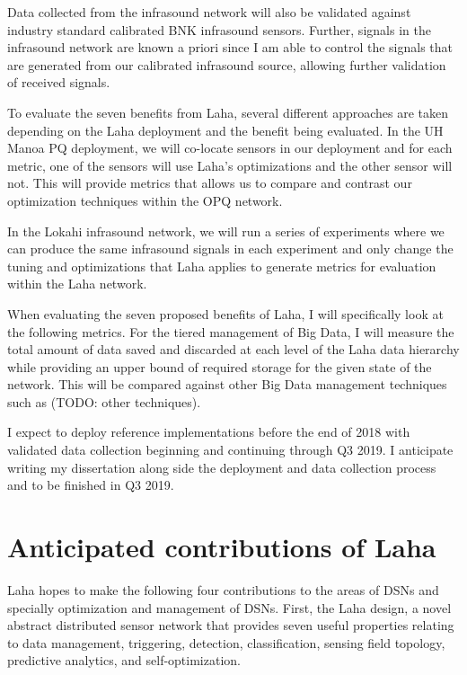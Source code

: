 Data collected from the infrasound network will also be validated against industry standard calibrated BNK infrasound sensors. Further, signals in the infrasound network are known a priori since I am able to control the signals that are generated from our calibrated infrasound source, allowing further validation of received signals.

To evaluate the seven benefits from Laha, several different approaches are taken depending on the Laha deployment and the benefit being evaluated. In the UH Manoa PQ deployment, we will co-locate sensors in our deployment and for each metric, one of the sensors will use Laha's optimizations and the other sensor will not. This will provide metrics that allows us to compare and contrast our optimization techniques within the OPQ network. 

In the Lokahi infrasound network, we will run a series of experiments where we can produce the same infrasound signals in each experiment and only change the tuning and optimizations that Laha applies to generate metrics for evaluation within the Laha network.

When evaluating the seven proposed benefits of Laha, I will specifically look at the following metrics. For the tiered management of Big Data, I will measure the total amount of data saved and discarded at each level of the Laha data hierarchy while providing an upper bound of required storage for the given state of the network. This will be compared against other Big Data management techniques such as (TODO: other techniques).


I expect to deploy reference implementations before the end of 2018 with validated data collection beginning and continuing through Q3 2019. I anticipate writing my dissertation along side the deployment and data collection process and to be finished in Q3 2019.

\section{Anticipated contributions of Laha}
Laha hopes to make the following four contributions to the areas of DSNs and specially optimization and management of DSNs.  First, the Laha design, a novel abstract distributed sensor network that provides seven useful properties relating to data management, triggering, detection, classification, sensing field topology, predictive analytics, and self-optimization.

